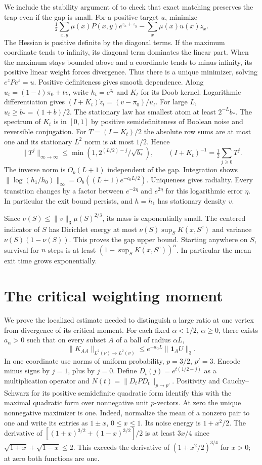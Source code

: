 \documentclass[11pt]{article}
\newcommand{\one}{\mathbf 1}
\begin{document}
We include the stability argument of \cite[Lemma 10.4]{mom} to check that exact matching preserves the trap even if the gap is small. For a positive target $u$, minimize
\[
 \tfrac12\sum_{x,y}\mu(x)P(x,y)e^{z_x+z_y}-\sum_x\mu(x)u(x)z_x .
\]
The Hessian is positive definite by the diagonal terms. If the maximum coordinate tends to infinity, its diagonal term dominates the linear part. When the maximum stays bounded above and a coordinate tends to minus infinity, its positive linear weight forces divergence. Thus there is a unique minimizer, solving $e^z P e^z=u$. Positive definiteness gives smooth dependence. Along $u_t=(1-t)\pi_0+t v$, write $h_t=e^{z_t}$ and $K_t$ for its Doob kernel. Logarithmic differentiation gives $(I+K_t)\dot z_t=(v-\pi_0)/u_t$. For large $L$, $u_t\ge b_*=(1+b)/2$. The stationary law has smallest atom at least $2^{-L} b_*$. The spectrum of $K_t$ is in $[0,1]$ by positive semidefiniteness of Boolean noise and reversible conjugation. For $T=(I-K_t)/2$ the absolute row sums are at most one and its stationary $L^2$ norm is at most $1/2$. Hence
\[
 \|T^j\|_{\infty\to\infty}\le\min(1,2^{(L/2)-j}/\sqrt{b_*}),
 \qquad (I+K_t)^{-1}=\tfrac12\sum_{j\ge0}T^j .
\]
The inverse norm is $O_b(L+1)$ independent of the gap. Integration shows $\|\log(h_1/h_0)\|_\infty=O_b((L+1)e^{-c_0 L/2})$. Uniqueness gives radiality. Every transition changes by a factor between $e^{-2\eta}$ and $e^{2\eta}$ for this logarithmic error $\eta$. In particular the exit bound persists, and $h=h_1$ has stationary density $v$.

Since $\nu(S)\le\|v\|_3\mu(S)^{2/3}$, its mass is exponentially small. The centered indicator of $S$ has Dirichlet energy at most $\nu(S)\sup_{S}K(x,S^c)$ and variance $\nu(S)(1-\nu(S))$. This proves the gap upper bound. Starting anywhere on $S$, survival for $n$ steps is at least $(1-\sup_S K(x,S^c))^n$. In particular the mean exit time grows exponentially.

\section{The critical weighting moment}
We prove the localized estimate needed to distinguish a large ratio at one vertex from divergence of its critical moment. For each fixed $\alpha<1/2$, $\alpha\ge0$, there exists $a_\alpha>0$ such that on every subset $A$ of a ball of radius $\alpha L$,
\[
 \|K_{AA}\|_{L^2(\nu)\to L^2(\nu)}
 \le e^{-a_\alpha L}\|\one_A U\|_3.                                      \tag{1}
\]
In one coordinate use norms of uniform probability, $p=3/2$, $p'=3$. Encode minus signs by $j=1$, plus by $j=0$. Define $D_t(j)=e^{t(1/2-j)}$ as a multiplication operator and $N(t)=\|D_t P D_t\|_{p\to p'}$. Positivity and Cauchy--Schwarz for its positive semidefinite quadratic form identify this with the maximal quadratic form over nonnegative unit $p$-vectors. At zero the unique nonnegative maximizer is one. Indeed, normalize the mean of a nonzero pair to one and write its entries as $1\pm x$, $0\le x\le1$. Its noise energy is $1+x^2/2$. The derivative of $[(1+x)^{3/2}+(1-x)^{3/2}]/2$ is at least $3x/4$ since $\sqrt{1+x}+\sqrt{1-x}\le2$. This exceeds the derivative of $(1+x^2/2)^{3/4}$ for $x>0$; at zero both functions are one.
\end{document}
